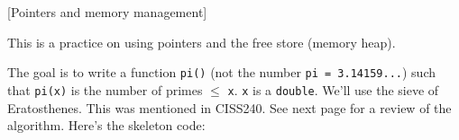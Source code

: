   [Pointers and memory management]

This is a practice on using pointers and the free store (memory heap).

The goal is to
write a function \verb!pi()! (not the number \verb!pi = 3.14159...!)
such that \verb!pi(x)! is the number of primes $\leq$ \verb!x!.
\verb!x! is a \verb!double!.
We'll use the
sieve of Eratosthenes.
This was mentioned in CISS240.
See next page for a review of the algorithm.
Here's the skeleton code:

\begin{comment}
In function \verb!pi()!, other than variable \verb!ret!, all
other variables must be pointers.

(Note: Again, this is a practice on using pointers and the memory heap.
It is actually more natural to use integer variables rather than pointers
in your function.)

The following skeleton code must be used.
Do not modify \verb!main()!.


\end{comment}

